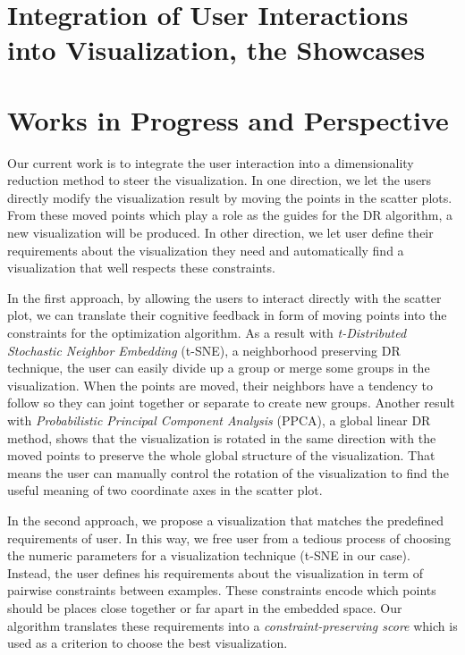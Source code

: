 
\section{Integration of User Interactions into Visualization, the Showcases}



\section{Works in Progress and Perspective}

Our current work is to integrate the user interaction into a dimensionality reduction method to steer the visualization.
In one direction, we let the users directly modify the visualization result by moving the points in the scatter plots.
From these moved points which play a role as the guides for the DR algorithm, a new visualization will be produced.
In other direction, we let user define their requirements about the visualization they need and automatically find a visualization that well respects these constraints.

In the first approach, by allowing the users to interact directly with the scatter plot, we can translate their cognitive feedback in form of moving points into the constraints for the optimization algorithm.
As a result with \emph{t-Distributed Stochastic Neighbor Embedding} (t-SNE), a neighborhood preserving DR technique, the user can easily divide up a group or merge some groups in the visualization.
When the points are moved, their neighbors have a tendency to follow so they can joint together or separate to create new groups.
Another result with \emph{Probabilistic Principal Component Analysis} (PPCA), a global linear DR method, shows that the visualization is rotated in the same direction with the moved points to preserve the whole global structure of the visualization. That means the user can manually control the rotation of the visualization to find the useful meaning of two coordinate axes in the scatter plot.

In the second approach, we propose a visualization that matches the predefined requirements of user.
In this way, we free user from a tedious process of choosing the numeric parameters for a visualization technique (t-SNE in our case).
Instead, the user defines his requirements about the visualization in term of pairwise constraints between examples.
These constraints encode which points should be places close together or far apart in the embedded space.
Our algorithm translates these requirements into a \emph{constraint-preserving score} which is used as a criterion to choose the best visualization.

